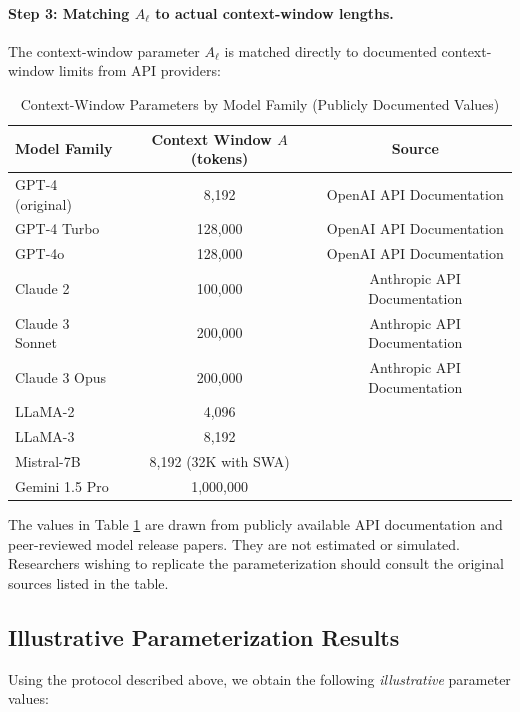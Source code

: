 \paragraph{Step 3: Matching $A_\ell$ to actual context-window lengths.} The context-window parameter $A_\ell$ is matched directly to documented context-window limits from API providers:

\begin{table}[htbp]
\centering
\caption{Context-Window Parameters by Model Family (Publicly Documented Values)}
\label{tab:context_windows}
\begin{tabular}{lcc}
\toprule
Model Family & Context Window $A$ (tokens) & Source \\
\midrule
GPT-4 (original) & 8,192 & OpenAI API Documentation \\
GPT-4 Turbo & 128,000 & OpenAI API Documentation \\
GPT-4o & 128,000 & OpenAI API Documentation \\
Claude 2 & 100,000 & Anthropic API Documentation \\
Claude 3 Sonnet & 200,000 & Anthropic API Documentation \\
Claude 3 Opus & 200,000 & Anthropic API Documentation \\
LLaMA-2 & 4,096 & \cite{touvron2023llama} \\
LLaMA-3 & 8,192 & \cite{llama32024} \\
Mistral-7B & 8,192 (32K with SWA) & \cite{jiang2023mistral} \\
Gemini 1.5 Pro & 1,000,000 & \cite{google2024gemini} \\
\bottomrule
\end{tabular}
\end{table}

The values in Table \ref{tab:context_windows} are drawn from publicly available API documentation and peer-reviewed model release papers. They are not estimated or simulated. Researchers wishing to replicate the parameterization should consult the original sources listed in the table.

\subsection{Illustrative Parameterization Results}
\label{subsec:calibration_results}

Using the protocol described above, we obtain the following \emph{illustrative} parameter values:

